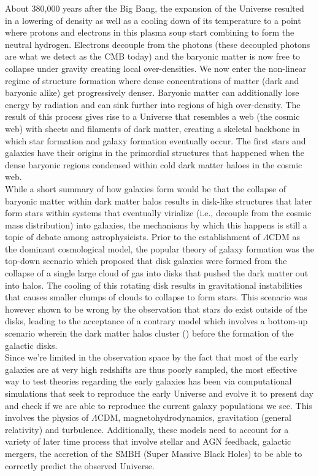 About 380,000 years after the Big Bang, the expansion of the Universe resulted in a lowering of density as well as a cooling down of its temperature to a point where protons and electrons in this plasma soup start combining to form the neutral hydrogen. Electrons decouple from the photons (these decoupled photons are what we detect as the CMB today) and the baryonic matter is now free to collapse under gravity creating local over-densities. We now enter the non-linear regime of structure formation where dense concentrations of matter (dark and baryonic alike) get progressively denser. Baryonic matter can additionally lose energy by radiation and can sink further into regions of high over-density. The result of this process gives rise to a Universe that resembles a web (the cosmic web) with sheets and filaments of dark matter, creating a skeletal backbone in which star formation and galaxy formation eventually occur. The first stars and galaxies have their origins in the primordial structures that happened when the dense baryonic regions condensed within cold dark matter haloes in the cosmic web.\\

While a short summary of how galaxies form would be that the collapse of baryonic matter within dark matter halos results in disk-like structures that later form stars within systems that eventually virialize (i.e., decouple from the cosmic mass distribution) into galaxies, the mechanisms by which this happens is still a topic of debate among astrophysicists.  Prior to the establishment of $\Lambda$CDM as the dominant cosmological model, the popular theory of galaxy formation was the top-down scenario \citep{1978ApJ...225..357S} which proposed that disk galaxies were formed from the collapse of a single large cloud of gas \citep{1962ApJ...136..748E} into disks that pushed the dark matter out into halos. The cooling of this rotating disk results in gravitational instabilities that causes smaller clumps of clouds to collapse to form stars. This scenario was however shown to be wrong by the observation that stars do exist outside of the disks, leading to the acceptance of a contrary model which involves a bottom-up scenario wherein the dark matter halos cluster (\citet{0004-637X-490-2-493, 2015PNAS..11212249W}) before the formation of the galactic disks.\\

Since we're limited in the observation space by the fact that most of the early galaxies are at very high redshifts are thus poorly sampled, the most effective way to test theories regarding the early galaxies has been via computational simulations that seek to reproduce the early Universe and evolve it to present day and check if we are able to reproduce the current galaxy populations we see. This involves the physics of $\Lambda$CDM, magnetohydrodynamics, gravitation (general relativity) and turbulence. Additionally, these models need to account for a variety of later time process that involve stellar and AGN feedback, galactic mergers, the accretion of the SMBH (Super Massive Black Holes) to be able to correctly predict the observed Universe. 

